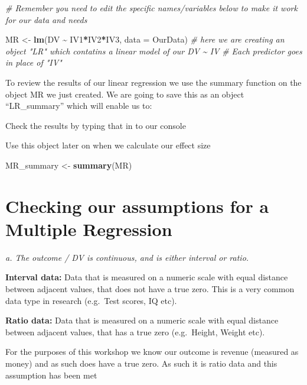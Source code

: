 \documentclass[
]{book}
\newenvironment{Shaded}{\begin{snugshade}}{\end{snugshade}}
\newcommand{\AttributeTok}[1]{\textcolor[rgb]{0.13,0.29,0.53}{#1}}
\newcommand{\CommentTok}[1]{\textcolor[rgb]{0.56,0.35,0.01}{\textit{#1}}}
\newcommand{\FunctionTok}[1]{\textcolor[rgb]{0.13,0.29,0.53}{\textbf{#1}}}
\newcommand{\NormalTok}[1]{#1}
\newcommand{\OtherTok}[1]{\textcolor[rgb]{0.56,0.35,0.01}{#1}}
\newcommand{\SpecialCharTok}[1]{\textcolor[rgb]{0.81,0.36,0.00}{\textbf{#1}}}
\begin{document}
\begin{Shaded}
\begin{Highlighting}[]
\CommentTok{\# Remember you need to edit the specific names/variables below to make it work for our data and needs}

\NormalTok{MR }\OtherTok{\textless{}{-}} \FunctionTok{lm}\NormalTok{(DV }\SpecialCharTok{\textasciitilde{}}\NormalTok{ IV1}\SpecialCharTok{*}\NormalTok{IV2}\SpecialCharTok{*}\NormalTok{IV3, }\AttributeTok{data =}\NormalTok{ OurData) }\CommentTok{\# here we are creating an object "LR" which contatins a linear model of our DV \textasciitilde{} IV }
\CommentTok{\# Each predictor goes in place of "IV"}
\end{Highlighting}
\end{Shaded}

To review the results of our linear regression we use the summary function on the object MR we just created. We are going to save this as an object ``LR\_summary'' which will enable us to:

Check the results by typing that in to our console

Use this object later on when we calculate our effect size

\begin{Shaded}
\begin{Highlighting}[]
\NormalTok{MR\_summary }\OtherTok{\textless{}{-}} \FunctionTok{summary}\NormalTok{(MR)}
\end{Highlighting}
\end{Shaded}

\section{Checking our assumptions for a Multiple Regression}\label{checking-our-assumptions-for-a-multiple-regression}

\emph{a. The outcome / DV is continuous, and is either interval or ratio.}

\textbf{Interval data:} Data that is measured on a numeric scale with equal distance between adjacent values, that does not have a true zero. This is a very common data type in research (e.g.~Test scores, IQ etc).

\textbf{Ratio data:} Data that is measured on a numeric scale with equal distance between adjacent values, that has a true zero (e.g.~Height, Weight etc).

For the purposes of this workshop we know our outcome is revenue (measured as money) and as such does have a true zero. As such it is ratio data and this assumption has been met
\end{document}
